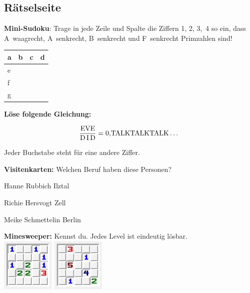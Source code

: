 \documentclass[twoside,12pt,parskip=half-]{scrartcl}
\begin{document}
\begin{multicols}{2}
\setlength{\parindent}{0pt}

\pagebreak
\section{Rätselseite}

\textbf{Mini-Sudoku}: Trage in jede Zeile und Spalte
  die Ziffern 1, 2, 3,~4 so ein, dass A~waagrecht, A~senkrecht,
  B~senkrecht und F~senkrecht Primzahlen sind!\\[0.2cm]
\begin{tabular}{ |p{0.8cm}|p{0.8cm}|p{0.8cm}|p{0.8cm}| }
\hline
  a & b & c & d \\[0.8cm]
\hline
  e &   &   &   \\[0.8cm]
\hline
  f &   &   &   \\[0.8cm]
\hline
  g &   &   &   \\[0.8cm]
\hline
\end{tabular}

\medskip
\textbf{Löse folgende Gleichung:}

\[\frac{\textrm{EVE}}{\textrm{D\,I\,D}} = \textrm{0,TALKTALKTALK}\dots\]

Jeder Buchstabe steht für eine andere Ziffer.

\textbf{Visitenkarten:} Welchen Beruf haben diese Personen?\\

\centerline{Hanne Rubbich \textendash{} Ilztal\\[0.2cm]}
\centerline{Richie Hersvogt \textendash{} Zell\\[0.2cm]}
\centerline{Meike Schmettelin \textendash{} Berlin\\[0.2cm]}

\medskip
\textbf{Minesweeper:} Kennst du.  Jedes Level ist eindeutig lösbar.\\[0.2cm]
\includegraphics[width=0.45\linewidth]{minepuzzle_gen02tr.png}
\includegraphics[width=0.45\linewidth]{minepuzzle_gen14tr.png}


\end{multicols}
\end{document}
